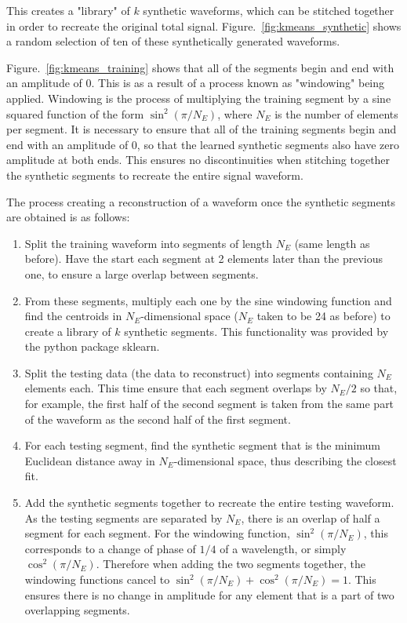 This creates a "library" of $k$ synthetic waveforms, which can be stitched together in order to recreate the original total signal. Figure.~\ref{fig:kmeans_synthetic} shows a random selection of ten of these synthetically generated waveforms.

Figure.~\ref{fig:kmeans_training} shows that all of the segments begin and end with an amplitude of $0$. This is as a result of a process known as "windowing" being applied. Windowing is the process of multiplying the training segment by a sine squared function of the form $\sin^2(\pi/N_E)$, where $N_E$ is the number of elements per segment. It is necessary to ensure that all of the training segments begin and end with an amplitude of $0$, so that the learned synthetic segments also have zero amplitude at both ends. This ensures no discontinuities when stitching together the synthetic segments to recreate the entire signal waveform. 

The process creating a reconstruction of a waveform once the synthetic segments are obtained is as follows:

\begin{enumerate}
    \item Split the training waveform into segments of length $N_E$ (same length as before). Have the start each segment at 2 elements later than the previous one, to ensure a large overlap between segments.
    \item From these segments, multiply each one by the sine windowing function and find the centroids in $N_E$-dimensional space ($N_E$ taken to be 24 as before) to create a library of $k$ synthetic segments. This functionality was provided by the python package sklearn.
    \item Split the testing data (the data to reconstruct) into segments containing $N_E$ elements each. This time ensure that each segment overlaps by $N_E/2$ so that, for example, the first half of the second segment is taken from the same part of the waveform as the second half of the first segment.
    \item For each testing segment, find the synthetic segment that is the minimum Euclidean distance away in $N_E$-dimensional space, thus describing the closest fit. 
    \item Add the synthetic segments together to recreate the entire testing waveform. As the testing segments are separated by $N_E$, there is an overlap of half a segment for each segment. For the windowing function, $\sin^2(\pi/N_E)$, this corresponds to a change of phase of $1/4$ of a wavelength, or simply $\cos^2(\pi/N_E)$. Therefore when adding the two segments together, the windowing functions cancel to $\sin^2(\pi/N_E) + \cos^2(\pi/N_E) = 1$. This ensures there is no change in amplitude for any element that is a part of two overlapping segments.
\end{enumerate}


